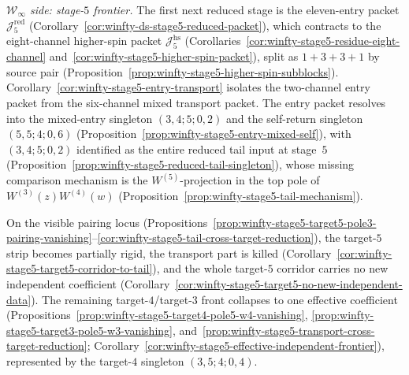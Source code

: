 \begin{proposition}
\begin{enumerate}[label=\textup{(\alph*)}]
  \emph{$\mathcal{W}_\infty$ side: stage-$5$ frontier.}
  The first next reduced stage is the eleven-entry packet
  $\mathcal{J}_5^{\mathrm{red}}$
  (Corollary~\ref{cor:winfty-ds-stage5-reduced-packet}), which
  contracts to the eight-channel higher-spin packet
  $\mathcal{J}_5^{\mathrm{hs}}$
  (Corollaries~\ref{cor:winfty-stage5-residue-eight-channel}
  and~\ref{cor:winfty-stage5-higher-spin-packet}), split as
  $1{+}3{+}3{+}1$ by source pair
  (Proposition~\ref{prop:winfty-stage5-higher-spin-subblocks}).
  Corollary~\ref{cor:winfty-stage5-entry-transport} isolates the
  two-channel entry packet from the six-channel mixed transport
  packet.  The entry packet resolves into the mixed-entry singleton
  $(3,4;5;0,2)$ and the self-return singleton $(5,5;4;0,6)$
  (Proposition~\ref{prop:winfty-stage5-entry-mixed-self}), with
  $(3,4;5;0,2)$ identified as the entire reduced tail input at
  stage~$5$
  (Proposition~\ref{prop:winfty-stage5-reduced-tail-singleton}), whose
  missing comparison mechanism is the $W^{(5)}$-projection in the top
  pole of $W^{(3)}(z)W^{(4)}(w)$
  (Proposition~\ref{prop:winfty-stage5-tail-mechanism}).

  On the visible pairing locus
  (Propositions~\ref{prop:winfty-stage5-target5-pole3-pairing-vanishing}--\ref{cor:winfty-stage5-tail-cross-target-reduction}),
  the target-$5$ strip becomes partially rigid, the transport part is
  killed
  (Corollary~\ref{cor:winfty-stage5-target5-corridor-to-tail}), and
  the whole target-$5$ corridor carries no new independent coefficient
  (Corollary~\ref{cor:winfty-stage5-target5-no-new-independent-data}).
  The remaining target-$4$/target-$3$ front collapses to one effective
  coefficient
  (Propositions~\ref{prop:winfty-stage5-target4-pole5-w4-vanishing},
  \ref{prop:winfty-stage5-target3-pole5-w3-vanishing},
  and~\ref{prop:winfty-stage5-transport-cross-target-reduction};
  Corollary~\ref{cor:winfty-stage5-effective-independent-frontier}),
  represented by the target-$4$ singleton $(3,5;4;0,4)$.


\end{enumerate}
\end{proposition}

